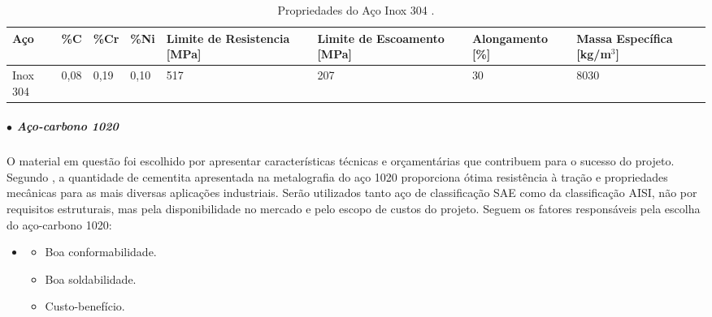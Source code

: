 \begin{table}[H]
    \centering
    \caption{Propriedades do Aço Inox 304 \cite{Askeland_Wright_2019}.}
    \label{fig:PropAI}
    \begin{adjustbox}{max width = \textwidth}
        \begin{tabular}{|C{1.5cm}|C{1.5cm}|C{1.5cm}|C{1.5cm}|C{3cm}|C{3cm}|C{2.8cm}|C{3cm}|}
            \hline
            \textbf{Aço} & \textbf{\%C} & \textbf{\%Cr} & \textbf{\%Ni} & \textbf{Limite de Resistencia [MPa]} & \textbf{Limite de Escoamento [MPa]} & \textbf{Alongamento [\%]} & \textbf{Massa Específica [kg/m$^3$]}  \\ \hline
            
              Inox 304 & 0,08 & 0,19 & 0,10  & 517 & 207 & 30 & 8030              \\ \hline
            
        \end{tabular}
    \end{adjustbox}
\end{table}

\subparagraph*{$\bullet$ Aço-carbono 1020}\hfill

O material em questão foi escolhido por apresentar características técnicas e orçamentárias que contribuem para o sucesso do projeto. Segundo \cite{Aco_1020_ensaio}, a quantidade de cementita apresentada na metalografia do aço 1020 proporciona ótima resistência à traç{\~a}o e propriedades mecânicas para as mais diversas aplicações industriais. Serão utilizados tanto aço de classificação SAE como da classificação AISI, não por requisitos estruturais, mas pela disponibilidade no mercado e pelo escopo de custos do projeto. Seguem os fatores responsáveis pela escolha do aço-carbono 1020:

\begin{itemize}
    \item []
    \begin{itemize}
        \item Boa conformabilidade.
        \item Boa soldabilidade.
        \item Custo-benefício.
    \end{itemize}
\end{itemize}

